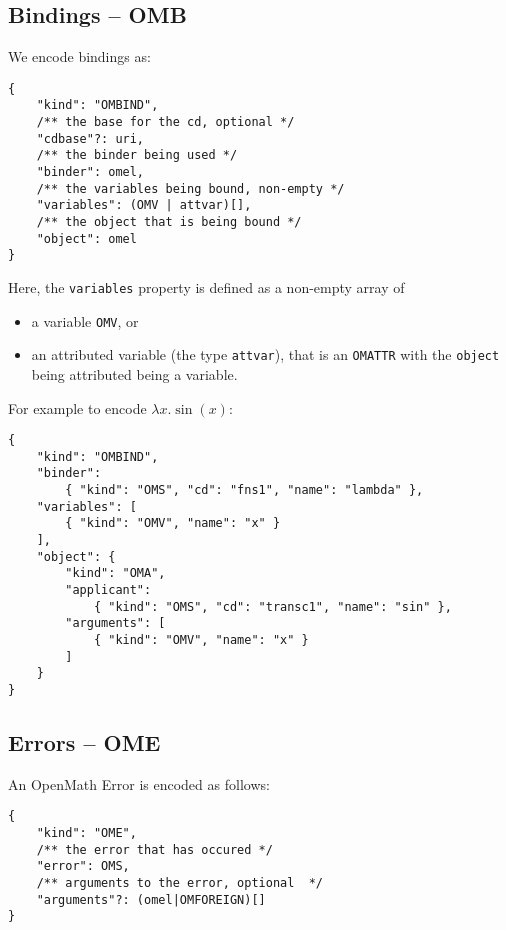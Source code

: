 \subsection{Bindings -- OMB}

We encode bindings as:
\\\begin{minipage}{\linewidth}
\begin{lstlisting}
{
    "kind": "OMBIND", 
    /** the base for the cd, optional */
    "cdbase"?: uri, 
    /** the binder being used */
    "binder": omel,
    /** the variables being bound, non-empty */
    "variables": (OMV | attvar)[],
    /** the object that is being bound */
    "object": omel
}
\end{lstlisting}\end{minipage}

Here, the \texttt{variables} property is defined as a non-empty array of
\begin{itemize}
    \item a variable \texttt{OMV}, or
    \item an attributed variable (the type \texttt{attvar}), that is an \texttt{OMATTR} with the \texttt{object} being attributed being a variable. 
\end{itemize}

For example to encode $\lambda x . \sin(x)$:
\\\begin{minipage}{\linewidth}
\begin{lstlisting}
{  
    "kind": "OMBIND",
    "binder": 
        { "kind": "OMS", "cd": "fns1", "name": "lambda" },
    "variables": [  
        { "kind": "OMV", "name": "x" }
    ],
    "object": {  
        "kind": "OMA",
        "applicant":
            { "kind": "OMS", "cd": "transc1", "name": "sin" },
        "arguments": [
            { "kind": "OMV", "name": "x" }
        ]
    }
}
\end{lstlisting}\end{minipage}

\subsection{Errors -- OME}

An OpenMath Error is encoded as follows:
\\\begin{minipage}{\linewidth}
\begin{lstlisting}
{
    "kind": "OME", 
    /** the error that has occured */
    "error": OMS,
    /** arguments to the error, optional  */
    "arguments"?: (omel|OMFOREIGN)[]
}
\end{lstlisting}\end{minipage}

